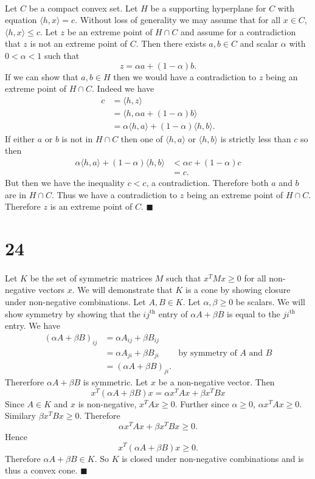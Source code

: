 \documentclass[letterpaper,12pt,oneside,onecolumn]{article}
\begin{document}
\paragraph{}
Let $C$ be a compact convex set. Let $H$ be a supporting hyperplane for $C$ with equation $\langle h,x \rangle = c$. Without loss of generality we may assume that for all $x \in C$, $\langle h,x \rangle \leq c$. Let $z$ be an extreme point of $H\cap C$ and assume for a contradiction that $z$ is not an extreme point of $C$. Then there exists $a,b \in C$ and scalar $\alpha$ with $0<\alpha<1$ such that $$z = \alpha a + (1-\alpha)b.$$
If we can show that $a,b \in H$ then we would have a contradiction to $z$ being an extreme point of $H\cap C$. Indeed we have
\begin{align*}
c &= \langle h,z \rangle \\
&= \langle h, \alpha a + (1-\alpha)b \rangle\\
&= \alpha \langle h,a\rangle + (1-\alpha)\langle h,b \rangle.
\end{align*}
If either $a$ or $b$ is not in $H \cap C$ then one of $\langle h,a \rangle$ or $\langle h,b \rangle $ is strictly less than $c$ so then
\begin{align*}
\alpha \langle h,a\rangle + (1-\alpha)\langle h,b \rangle &< \alpha c + (1-\alpha) c\\
&= c.
\end{align*}
But then we have the inequality $c < c$, a contradiction. Therefore both $a$ and $b$ are in $H \cap C$. Thus we have a contradiction to $z$ being an extreme point of $H \cap C$. Therefore $z$ is an extreme point of $C$. $\blacksquare$
\section*{24}
\paragraph{}
Let $K$ be the set of symmetric matrices $M$ such that $x^TMx \geq 0$ for all non-negative vectors $x$. We will demonstrate that $K$ is a cone by showing closure under non-negative combinations. Let $A, B \in K$. Let $\alpha, \beta \geq 0$ be scalars. We will show symmetry by showing that the $ij^\text{th}$ entry of $\alpha A + \beta B$ is equal to the $ji^\text{th}$ entry. We have
\begin{align*}
(\alpha A + \beta B)_{ij} &= \alpha A_{ij} + \beta B_{ij} \\
&=\alpha A_{ji} + \beta B_{ji} &\text{by symmetry of $A$ and $B$} \\
&= (\alpha A + \beta B)_{ji}.
\end{align*}
Thererfore $\alpha A + \beta B$ is symmetric.
Let $x$ be a non-negative vector. Then 
$$ x^T(\alpha A + \beta B) x = \alpha x^TAx + \beta x^TBx
$$
Since $A \in K$ and $x$ is non-negative, $x^TAx \geq 0$. Further since $\alpha \geq 0$, $\alpha x^T A x \geq 0$. Similary $\beta x^TBx \geq 0$. Therefore
$$\alpha x^TAx + \beta x^TB x \geq 0.$$
Hence $$x^T(\alpha A + \beta B) x \geq 0.$$
Therefore $\alpha A + \beta B \in K$. So $K$ is closed under non-negative combinations and is thus a convex cone. $\blacksquare$
\end{document}
